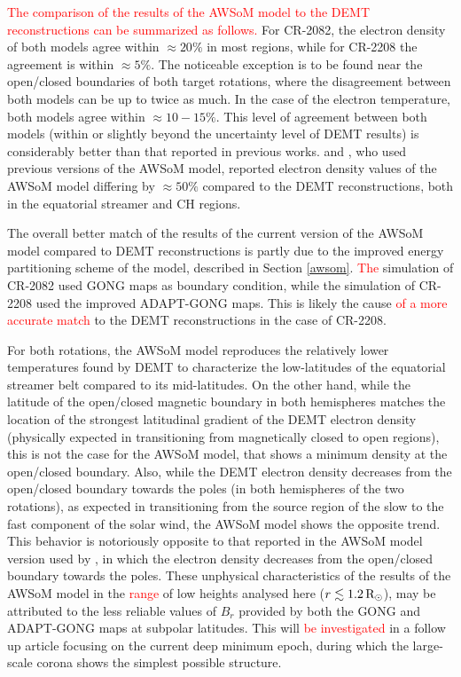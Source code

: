 \documentclass[namedreferences]{solarphysics}
\def\edit#1{\textcolor{Red}{#1}}
\newcommand{\mrsun}{{\rm R_\odot}}
\begin{document}
\begin{article}
\edit{The comparison of the results of the AWSoM model to the DEMT reconstructions can be summarized as follows.} For CR-2082, the electron density of both models agree within $\approx 20\%$ {in most regions}, while for CR-2208 the agreement is within $\approx 5\%$. {The noticeable exception is to be found near the open/closed boundaries of both target rotations, where the disagreement between both models can be up to twice as much.} In the case of the electron temperature, both models agree within $\approx 10-15\%$. This level of agreement between both models {(within or slightly beyond the uncertainty level of DEMT results)} is considerably better than that reported in previous works. \citet{jin_2012} and \citet{oran_2015}{, who used previous versions of the AWSoM model,} reported electron density values of the AWSoM model {differing by $\approx 50\%$ compared to the DEMT reconstructions, both in the equatorial streamer and CH regions.} 

{The overall better match of the results of the current version of the AWSoM model compared to DEMT reconstructions is partly due to the improved energy partitioning scheme of the model, described in Section \ref{awsom}. \edit{The} simulation of CR-2082 used GONG maps as boundary condition, while the simulation of CR-2208 used the improved ADAPT-GONG maps. This is likely the cause \edit{of a more accurate match} to the DEMT reconstructions in the case of CR-2208.}

For both rotations, the AWSoM model reproduces the relatively lower temperatures found by DEMT to characterize the low-latitudes of the equatorial streamer belt compared to its mid-latitudes. On the other hand, while the latitude of the open/closed magnetic boundary in both hemispheres matches the location of the strongest latitudinal gradient of the DEMT electron density {(physically expected in transitioning from magnetically closed to open regions)}, this is not the case for the AWSoM model, that shows a minimum density at the open/closed boundary. Also, while the DEMT electron density decreases from the open/closed boundary towards the poles (in both hemispheres of the two rotations), {as expected in transitioning from the source region of the slow to the fast component of the solar wind}, the AWSoM model shows the opposite trend. This behavior is notoriously opposite to that reported in the AWSoM model version used by \citet{oran_2015}, in which the electron density decreases from the open/closed boundary towards the poles. These unphysical characteristics of the results of the AWSoM model in the \edit{range} of low heights analysed here ($r\lesssim 1.2\,\mrsun$), may be attributed to the less reliable values of $B_r$ provided by both the GONG and ADAPT-GONG maps at subpolar latitudes. This will \edit{be investigated} in a follow up article focusing on the current deep minimum epoch, during which the large-scale corona shows the simplest possible structure.


\end{article}
\end{document}

